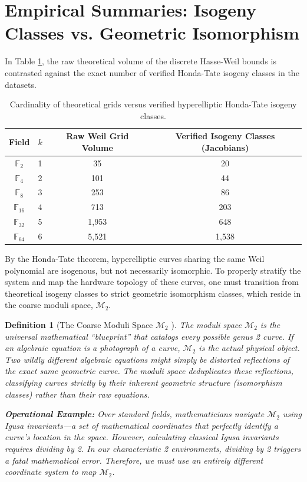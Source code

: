 \documentclass[11pt,letterpaper]{article}
\newtheorem{definition}[theorem]{Definition}
\begin{document}
\section{Empirical Summaries: Isogeny Classes vs. Geometric Isomorphism}
In Table \ref{tab:isogeny_classes}, the raw theoretical volume of the discrete Hasse-Weil bounds is contrasted against the exact number of verified Honda-Tate isogeny classes in the datasets.

\begin{table}[h!]
\centering
\begin{tabular}{cccc}
\toprule
Field & $k$ & Raw Weil Grid Volume & Verified Isogeny Classes (Jacobians) \\
\midrule
$\mathbb{F}_2$ & 1 & 35 & 20 \\
$\mathbb{F}_4$ & 2 & 101 & 44 \\
$\mathbb{F}_8$ & 3 & 253 & 86 \\
$\mathbb{F}_{16}$ & 4 & 713 & 203 \\
$\mathbb{F}_{32}$ & 5 & 1,953 & 648 \\
$\mathbb{F}_{64}$ & 6 & 5,521 & 1,538 \\
\bottomrule
\end{tabular}
\caption{Cardinality of theoretical grids versus verified hyperelliptic Honda-Tate isogeny classes.}
\label{tab:isogeny_classes}
\end{table}

By the Honda-Tate theorem, hyperelliptic curves sharing the same Weil polynomial are isogenous, but not necessarily isomorphic. To properly stratify the system and map the hardware topology of these curves, one must transition from theoretical isogeny classes to strict geometric isomorphism classes, which reside in the coarse moduli space, $\mathcal{M}_2$.

\begin{definition}[The Coarse Moduli Space $\mathcal{M}_2$ \cite{Igusa1960, Zobernig2021}]
The moduli space $\mathcal{M}_2$ is the universal mathematical ``blueprint'' that catalogs every possible genus 2 curve. If an algebraic equation is a photograph of a curve, $\mathcal{M}_2$ is the actual physical object. Two wildly different algebraic equations might simply be distorted reflections of the exact same geometric curve. The moduli space deduplicates these reflections, classifying curves strictly by their inherent geometric structure (isomorphism classes) rather than their raw equations.

\textbf{Operational Example:} Over standard fields, mathematicians navigate $\mathcal{M}_2$ using \textit{Igusa invariants}---a set of mathematical coordinates that perfectly identify a curve's location in the space. However, calculating classical Igusa invariants requires dividing by 2. In our characteristic 2 environments, dividing by 2 triggers a fatal mathematical error. Therefore, we must use an entirely different coordinate system to map $\mathcal{M}_2$.
\end{definition}
\end{document}
